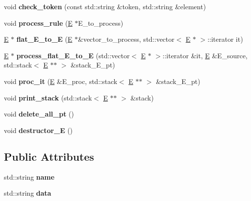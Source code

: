 \begin{DoxyCompactItemize}
\item 
void {\bfseries check\+\_\+token} (const std\+::string \&token, std\+::string \&element)\hypertarget{classE_a351f76b42477490d7a635cbeb7e13475}{}\label{classE_a351f76b42477490d7a635cbeb7e13475}

\item 
void {\bfseries process\+\_\+rule} (\hyperlink{classE}{E} $\ast$E\+\_\+to\+\_\+process)\hypertarget{classE_a6b1f1919aa4c3ad2195fbbbc13e6b83f}{}\label{classE_a6b1f1919aa4c3ad2195fbbbc13e6b83f}

\item 
\hyperlink{classE}{E} $\ast$ {\bfseries flat\+\_\+\+E\+\_\+to\+\_\+E} (\hyperlink{classE}{E} $\ast$\&vector\+\_\+to\+\_\+process, std\+::vector$<$ \hyperlink{classE}{E} $\ast$ $>$\+::iterator it)\hypertarget{classE_a737697af35b3e0dd26a9da673a09921f}{}\label{classE_a737697af35b3e0dd26a9da673a09921f}

\item 
\hyperlink{classE}{E} $\ast$ {\bfseries process\+\_\+flat\+\_\+\+E\+\_\+to\+\_\+E} (std\+::vector$<$ \hyperlink{classE}{E} $\ast$ $>$\+::iterator \&it, \hyperlink{classE}{E} \&E\+\_\+source, std\+::stack$<$ \hyperlink{classE}{E} $\ast$$\ast$ $>$ \&stack\+\_\+\+E\+\_\+pt)\hypertarget{classE_a6b7f2d901451dc4822d3b8dcdfd5772b}{}\label{classE_a6b7f2d901451dc4822d3b8dcdfd5772b}

\item 
void {\bfseries proc\+\_\+it} (\hyperlink{classE}{E} \&E\+\_\+proc, std\+::stack$<$ \hyperlink{classE}{E} $\ast$$\ast$ $>$ \&stack\+\_\+\+E\+\_\+pt)\hypertarget{classE_ab0835ffe36b91544fbc6ececceccda8c}{}\label{classE_ab0835ffe36b91544fbc6ececceccda8c}

\item 
void {\bfseries print\+\_\+stack} (std\+::stack$<$ \hyperlink{classE}{E} $\ast$$\ast$ $>$ \&stack)\hypertarget{classE_a1342223bc155721675d995cc91208dca}{}\label{classE_a1342223bc155721675d995cc91208dca}

\item 
void {\bfseries delete\+\_\+all\+\_\+pt} ()\hypertarget{classE_ae39d719737af65bef944f283fe872c8e}{}\label{classE_ae39d719737af65bef944f283fe872c8e}

\item 
void {\bfseries destructor\+\_\+E} ()\hypertarget{classE_a09718029acd816dd033853c94a1f8001}{}\label{classE_a09718029acd816dd033853c94a1f8001}

\end{DoxyCompactItemize}
\subsection*{Public Attributes}
\begin{DoxyCompactItemize}
\item 
std\+::string {\bfseries name}\hypertarget{classE_ab5acfaea249a136224a3ef4fc3e8fc80}{}\label{classE_ab5acfaea249a136224a3ef4fc3e8fc80}

\item 
std\+::string {\bfseries data}\hypertarget{classE_ae199dfce04c109f23799a5708a14a74a}{}\label{classE_ae199dfce04c109f23799a5708a14a74a}

\end{DoxyCompactItemize}
